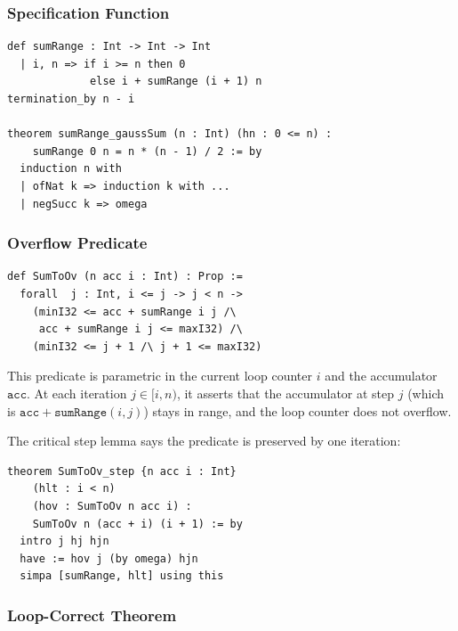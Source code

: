\subsubsection{Specification Function}

\begin{lstlisting}[caption={sumRange specification.},label={lst:sumrange}]
def sumRange : Int -> Int -> Int
  | i, n => if i >= n then 0
             else i + sumRange (i + 1) n
termination_by n - i

theorem sumRange_gaussSum (n : Int) (hn : 0 <= n) :
    sumRange 0 n = n * (n - 1) / 2 := by
  induction n with
  | ofNat k => induction k with ...
  | negSucc k => omega
\end{lstlisting}

\subsubsection{Overflow Predicate}

\begin{lstlisting}[caption={SumToOv: overflow condition for sumTo.},label={lst:sumtoov}]
def SumToOv (n acc i : Int) : Prop :=
  forall  j : Int, i <= j -> j < n ->
    (minI32 <= acc + sumRange i j /\
     acc + sumRange i j <= maxI32) /\
    (minI32 <= j + 1 /\ j + 1 <= maxI32)
\end{lstlisting}

This predicate is parametric in the current loop counter $i$ and the
accumulator $\texttt{acc}$. At each iteration $j \in [i, n)$, it asserts that
the accumulator at step $j$ (which is $\texttt{acc} + \texttt{sumRange}(i, j)$)
stays in range, and the loop counter does not overflow.

The critical step lemma says the predicate is preserved by one iteration:

\begin{lstlisting}[caption={SumToOv_step: invariant preservation.},label={lst:sumtoovstep}]
theorem SumToOv_step {n acc i : Int}
    (hlt : i < n)
    (hov : SumToOv n acc i) :
    SumToOv n (acc + i) (i + 1) := by
  intro j hj hjn
  have := hov j (by omega) hjn
  simpa [sumRange, hlt] using this
\end{lstlisting}

\subsubsection{Loop-Correct Theorem}

